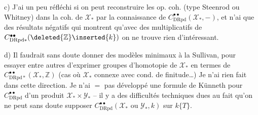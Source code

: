 
c) J'ai un peu réfléchi  si on peut reconstruire les op. coh.  (type Steenrod ou Whitney) dans la coh. de $\mathcal X_*$ par la connaissance de $C^{\bullet\bullet}_{\mathrm{DRpd}}(\mathcal X_*,-)$, et n'ai que des résultats  négatifs qui montrent qu'avec des  multiplicatifs de $C^{\bullet\bullet}_{\mathrm{DRpd}*}(\deleted{\mathbb Z}\inserted{k})$ on ne trouve rien d'intéressant.

d) Il faudrait sans doute donner des modèles minimaux à la Sullivan, pour essayer entre autres d'exprimer  groupes d'homotopie de $\mathcal X_*$ en termes de $C^{\bullet\bullet}_{\mathrm{DRpd}*}(\mathcal X_*,\mathbb Z)$ (cas où $\mathcal X_*$  connexe avec cond. de finitude\dots) Je n'ai rien fait dans cette direction. Je n'ai $=$ pas développé une formule de Künneth pour $C^{\bullet\bullet}_{\mathrm{DRpd}}$ d'un produit $\mathcal X_*\times\mathcal Y_*$ -- il y a des difficultés techniques dues au fait qu'on ne peut sans doute supposer $C^{\bullet\bullet}_{\mathrm{DRpd}}(\mathcal X_*\text{ ou }\mathcal Y_*,k)$  sur $k\{T\}$.


